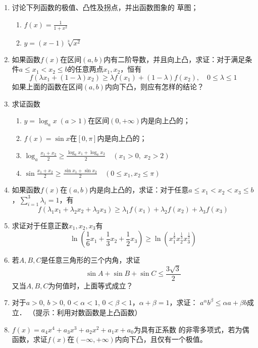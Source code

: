 \begin{ex}
\begin{enumerate}
    \item 讨论下列函数的极值、凸性及拐点，并出函数图象的
    草图；
\begin{multicols}{2}
\begin{enumerate}
    \item $f(x)=\frac{1}{1+x^2}$
    \item $y=(x-1)\sqrt[3]{x^2}$
\end{enumerate}
\end{multicols}
\item 如果函数$f(x)$在区间$(a,b)$内有二阶导数，并且向上凸，求证：对于满足条件$a\le x_1<x_2\le b$的任意两点$x_1,x_2$，恒有
\[f (\lambda x_1+ (1-\lambda) x_2) \ge \lambda f (x_1) + (1-\lambda)f (x_2) ,\quad  0\le\lambda\le 1\]
如果上面的函数在区间$(a,b)$内向下凸，则应有怎样的结论？
\item 求证函数
\begin{enumerate}
    \item $y=\log_ax \; (a>1)$在区间$(0,+\infty)$内是向上凸的；
    \item $f(x)=\sin x$在$[0,\pi]$内是向上凸的；
    \item $\log_a\frac{x_1+x_2}{2}\ge \frac{\log_a x_1+\log_a x_2}{2}\quad (x_1> 0,\; x_2>2)$
    \item $\sin\frac{x_1+x_2}{2}\ge \frac{\sin x_1+\sin x_2}{2}\quad  (0\le x_1,x_2\le \pi)$
\end{enumerate}

\item 如果函数$f(x)$在$(a,b)$内是向上凸的，求证：对于任意$a\le x_1<x_2<x_3\le b$，$\sum^3_{i=1}\lambda_i=1$，有
\[f(\lambda_1x_1+\lambda_2x_2+\lambda_3x_3)\ge \lambda_1f(x_1)+\lambda_2f(x_2)+\lambda_3f(x_3)\]

\item  求证对于任意正数$x_1,x_2,x_3$有
\[\ln\left(\frac{1}{6}x_1+\frac{1}{3}x_2+\frac{1}{2}x_3\right) \ge \ln \left(x_1^{\tfrac{1}{6}}x_2^{\tfrac{1}{3}}x_3^{\tfrac{1}{2}} \right)\]
\item  若$A,B,C$是任意三角形的三个内角，求证
\[\sin A+\sin B+\sin C\le \frac{3\sqrt{3}}{2}\]
又当$A,B,C$为何值时，上面等式成立？
\item  对于$a>0$, $b>0$, $0<\alpha<1$, $0<\beta<1$，$\alpha+\beta=1$，求证：
$a^{\alpha}b^{\beta}\le \alpha a+\beta b$成立．
（提示：利用对数函数是上凸函数）
\item  $f(x)=a_4x^4+a_3x^3+a_2x^2+a_1x+a_0$为具有正系数
的非零多项式，若为偶函数，求证$f(x)$在$(-\infty,+\infty)$内向下凸，且仅有一个极值。
\end{enumerate}
\end{ex}

